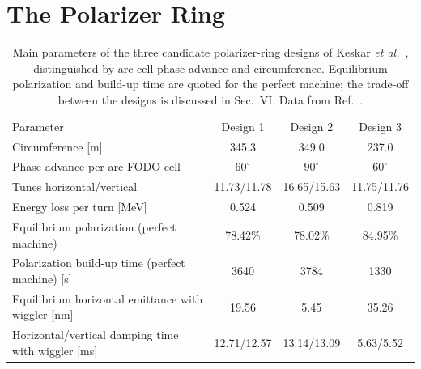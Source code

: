 \documentclass[%
 aip,
 amsmath,amssymb,
 reprint,%
superscriptaddress
]{revtex4-2}
\begin{document}
\section{The Polarizer Ring}
\begin{table}[t!]
  \caption{Main parameters of the three candidate polarizer-ring designs
    of Keskar \textit{et al.}~\cite{keskar_bartosik_carli_2026}, distinguished by arc-cell
    phase advance and circumference. Equilibrium polarization and build-up
    time are quoted for the perfect machine; the trade-off between the
    designs is discussed in Sec.~VI. Data from
    Ref.~\cite{keskar_bartosik_carli_2026}.}
  \label{tab:designs}
  \begin{ruledtabular}
    \begin{tabular}{lccc}
      Parameter & Design 1 & Design 2 & Design 3 \\
      \colrule
      Circumference [m]                  & 345.3 & 349.0 & 237.0 \\
      Phase advance per arc FODO cell              & $60^\circ$ & $90^\circ$ & $60^\circ$ \\
      Tunes horizontal/vertical                    & 11.73/11.78 & 16.65/15.63 & 11.75/11.76 \\
      Energy loss per turn [MeV]& 0.524 & 0.509 & 0.819 \\
      Equilibrium polarization (perfect machine)   & 78.42\% & 78.02\% & 84.95\% \\
      Polarization build-up time (perfect machine) [s] & 3640 & 3784 & 1330 \\
      Equilibrium horizontal emittance with wiggler [nm] & 19.56 & 5.45 & 35.26 \\
      Horizontal/vertical damping time with wiggler [ms] & 12.71/12.57 & 13.14/13.09 & 5.63/5.52 \\
    \end{tabular}
  \end{ruledtabular}
\end{table}
\end{document}
